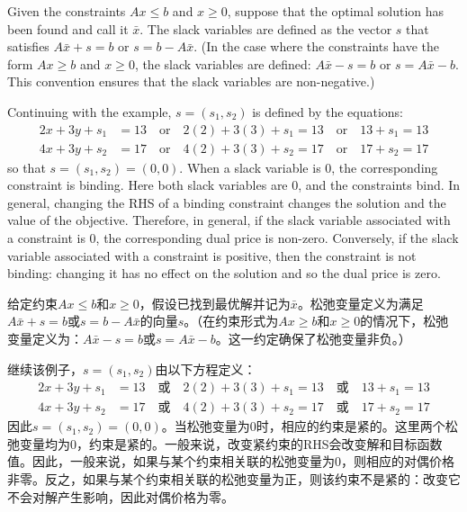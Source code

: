 \begin{original}
Given the constraints $Ax \le b$ and $x \ge 0$, suppose that the optimal solution has been found and call it $\bar{x}$. The slack variables are defined as the vector $s$ that satisfies $A\bar{x} + s = b$ or $s = b - A\bar{x}$. (In the case where the constraints have the form $Ax \ge b$ and $x \ge 0$, the slack variables are defined: $A\bar{x} - s = b$ or $s = A\bar{x} - b$. This convention ensures that the slack variables are non-negative.)

Continuing with the example, $s = (s_1, s_2)$ is defined by the equations:
\[
\begin{aligned}
2x + 3y + s_1 &= 13 \quad \text{or} \quad 2(2) + 3(3) + s_1 = 13 \quad \text{or} \quad 13 + s_1 = 13 \\
4x + 3y + s_2 &= 17 \quad \text{or} \quad 4(2) + 3(3) + s_2 = 17 \quad \text{or} \quad 17 + s_2 = 17
\end{aligned}
\]
so that $s = (s_1, s_2) = (0,0)$. When a slack variable is 0, the corresponding constraint is binding. Here both slack variables are 0, and the constraints bind. In general, changing the RHS of a binding constraint changes the solution and the value of the objective. Therefore, in general, if the slack variable associated with a constraint is 0, the corresponding dual price is non-zero. Conversely, if the slack variable associated with a constraint is positive, then the constraint is not binding: changing it has no effect on the solution and so the dual price is zero.
\end{original}
\begin{translation}
给定约束$Ax \le b$和$x \ge 0$，假设已找到最优解并记为$\bar{x}$。松弛变量定义为满足$A\bar{x} + s = b$或$s = b - A\bar{x}$的向量$s$。（在约束形式为$Ax \ge b$和$x \ge 0$的情况下，松弛变量定义为：$A\bar{x} - s = b$或$s = A\bar{x} - b$。这一约定确保了松弛变量非负。）

继续该例子，$s = (s_1, s_2)$由以下方程定义：
\[
\begin{aligned}
2x + 3y + s_1 &= 13 \quad \text{或} \quad 2(2) + 3(3) + s_1 = 13 \quad \text{或} \quad 13 + s_1 = 13 \\
4x + 3y + s_2 &= 17 \quad \text{或} \quad 4(2) + 3(3) + s_2 = 17 \quad \text{或} \quad 17 + s_2 = 17
\end{aligned}
\]
因此$s = (s_1, s_2) = (0,0)$。当松弛变量为0时，相应的约束是紧的。这里两个松弛变量均为0，约束是紧的。一般来说，改变紧约束的RHS会改变解和目标函数值。因此，一般来说，如果与某个约束相关联的松弛变量为0，则相应的对偶价格非零。反之，如果与某个约束相关联的松弛变量为正，则该约束不是紧的：改变它不会对解产生影响，因此对偶价格为零。
\end{translation}

